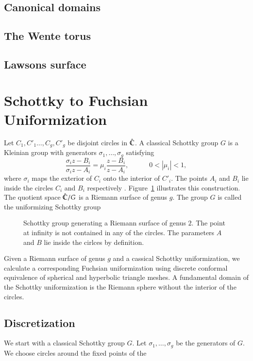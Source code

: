 \subsection{Canonical domains}
\subsection{The Wente torus}
\subsection{Lawsons surface}



\section{Schottky to Fuchsian Uniformization}
Let $C_1,C'_1\ldots,C_g,C'_g$ be disjoint circles in $\hat{\mathbb C}$. A classical Schottky group $G$ is a Kleinian group
with generators $\sigma_1,\ldots,\sigma_g$ satisfying
\[\frac{\sigma_i z - B_i}{\sigma_i z - A_i} = \mu_i \frac{z - B_i}{z - A_i}, \quad\quad\quad 0 < \left|\mu_i\right|<1,\]
where $\sigma_i$ maps the exterior of $C_i$ onto the interior of $C'_i$. The points $A_i$ and $B_i$ lie inside the circles $C_i$ and $B_i$ respectively \cite{bobenko2011riemann}. Figure~\ref{fig:schottky_group} illustrates this construction.
The quotient space $\hat{\mathbb C}/G$ is a Riemann surface of genus $g$. The group $G$ is called the uniformizing
Schottky group

\begin{figure}
	\centering
	\scalebox{1.0}{}
	\caption{Schottky group generating a Riemann surface of genus $2$. The point at infinity is not contained in 
any of the circles. The parameters $A$ and $B$ lie inside the cirlces by definition.}
	\label{fig:schottky_group}
\end{figure}

Given a Riemann surface of genus $g$ and a cassical Schottky uniformization, we calculate a corresponding 
Fuchsian uniformization using discrete conformal equivalence of spherical and hyperbolic triangle meshes.
A fundamental domain of the Schottky uniformization is the Riemann sphere without the interior of the circles.

\subsection{Discretization}

We start with a classical Schottky group $G$. Let $\sigma_1,\ldots,\sigma_g$ be the generators of $G$. We choose circles around the fixed points of the

